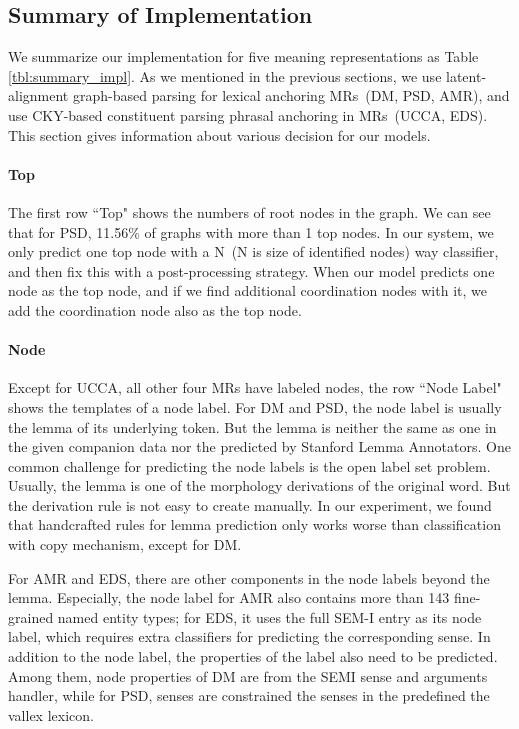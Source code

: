 \subsection{Summary of Implementation}
\label{ssec:impl_summary}

We summarize our implementation for five meaning representations as
Table \ref{tbl:summary_impl}. As we mentioned in the previous
sections, we use latent-alignment graph-based parsing for lexical
anchoring MRs~(DM, PSD, AMR), and use CKY-based constituent parsing
phrasal anchoring in MRs~(UCCA, EDS). This section gives information
about various decision for our models.

\paragraph{Top} The first row ``Top" shows the numbers of root nodes in
the graph.  We can see that for PSD, 11.56\% of graphs with more than
1 top nodes. In our system, we only predict one top node with a N~(N is size of identified nodes) way
classifier, and then fix this with a post-processing strategy. When
our model predicts one node as the top node, and if we find additional
coordination nodes with it, we add the coordination node also as the
top node.

\paragraph{Node} Except for UCCA, all other four MRs have labeled
nodes, the row ``Node Label" shows the templates of a node label. For
DM and PSD, the node label is usually the lemma of its underlying
token. But the lemma is neither the same as one in the given companion
data nor the predicted by Stanford Lemma Annotators. One common
challenge for predicting the node labels is the open label set
problem. Usually, the lemma is one of the morphology derivations of
the original word. But the derivation rule is not easy to create
manually. In our experiment, we found that handcrafted rules for lemma
prediction only works worse than classification with copy mechanism,
except for DM.

For AMR and EDS, there are other components in the node
labels beyond the lemma. Especially, the node label for AMR also
contains more than 143 fine-grained named entity types; for EDS, it
uses the full SEM-I entry as its node label, which requires extra
classifiers for predicting the corresponding sense. In addition to the
node label, the properties of the label also need to be
predicted. Among them, node properties of DM are from the SEMI sense
and arguments handler, while for PSD, senses are constrained the
senses in the predefined the vallex lexicon.

